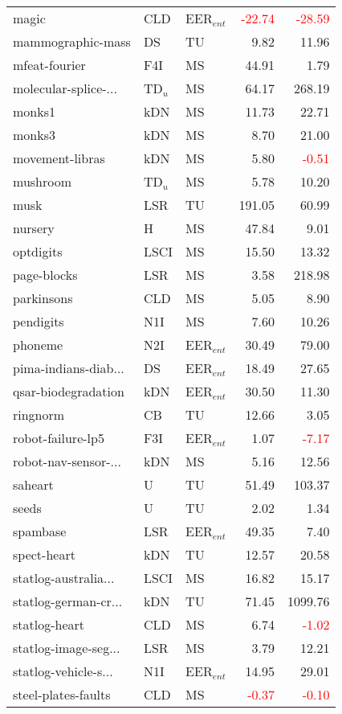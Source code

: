\begin{tabular}{lllrr}
magic & CLD & EER$_{ent}$ & \textcolor{red}{-22.74} & \textcolor{red}{-28.59} \\
mammographic-mass & DS & TU & 9.82 & 11.96 \\
mfeat-fourier & F4I & MS & 44.91 & 1.79 \\
molecular-splice-... & TD$_{u}$ & MS & 64.17 & 268.19 \\
monks1 & kDN & MS & 11.73 & 22.71 \\
monks3 & kDN & MS & 8.70 & 21.00 \\
movement-libras & kDN & MS & 5.80 & \textcolor{red}{-0.51} \\
mushroom & TD$_{u}$ & MS & 5.78 & 10.20 \\
musk & LSR & TU & 191.05 & 60.99 \\
nursery & H & MS & 47.84 & 9.01 \\
optdigits & LSCI & MS & 15.50 & 13.32 \\
page-blocks & LSR & MS & 3.58 & 218.98 \\
parkinsons & CLD & MS & 5.05 & 8.90 \\
pendigits & N1I & MS & 7.60 & 10.26 \\
phoneme & N2I & EER$_{ent}$ & 30.49 & 79.00 \\
pima-indians-diab... & DS & EER$_{ent}$ & 18.49 & 27.65 \\
qsar-biodegradation & kDN & EER$_{ent}$ & 30.50 & 11.30 \\
ringnorm & CB & TU & 12.66 & 3.05 \\
robot-failure-lp5 & F3I & EER$_{ent}$ & 1.07 & \textcolor{red}{-7.17} \\
robot-nav-sensor-... & kDN & MS & 5.16 & 12.56 \\
saheart & U & TU & 51.49 & 103.37 \\
seeds & U & TU & 2.02 & 1.34 \\
spambase & LSR & EER$_{ent}$ & 49.35 & 7.40 \\
spect-heart & kDN & TU & 12.57 & 20.58 \\
statlog-australia... & LSCI & MS & 16.82 & 15.17 \\
statlog-german-cr... & kDN & TU & 71.45 & 1099.76 \\
statlog-heart & CLD & MS & 6.74 & \textcolor{red}{-1.02} \\
statlog-image-seg... & LSR & MS & 3.79 & 12.21 \\
statlog-vehicle-s... & N1I & EER$_{ent}$ & 14.95 & 29.01 \\
steel-plates-faults & CLD & MS & \textcolor{red}{-0.37} & \textcolor{red}{-0.10} \\

\end{tabular}
